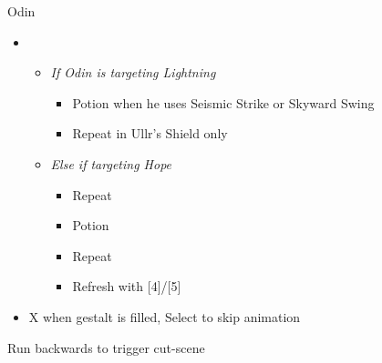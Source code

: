 \begin{paracol}{2}
\begin{battle}{Odin}
\begin{itemize}
			\item \fifth
			      \begin{itemize}
				      \item \textit{If Odin is targeting Lightning}
				            \begin{itemize}
					            \item Potion when he uses Seismic Strike or Skyward Swing
					            \item Repeat in Ullr's Shield only
				            \end{itemize}
				      \item \textit{Else if targeting Hope}
				            \begin{itemize}
					            \item Repeat
					            \item Potion
					            \item Repeat
					            \item Refresh with [4]/[5]
				            \end{itemize}
			      \end{itemize}
			\item X when gestalt is filled, Select to skip animation
		\end{itemize}
	\end{battle}
	\switchcolumn*
	Run backwards to trigger cut-scene




\end{paracol}
